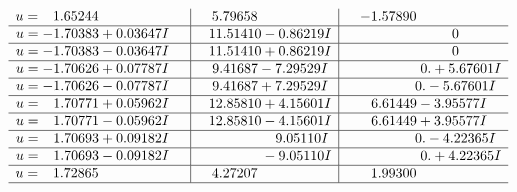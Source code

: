 \documentclass[1p]{elsarticle_modified}
\theoremstyle{definition}
\begin{document}
$$\begin{array}{c|c|c}
\begin{aligned}
u &= \phantom{-}1.65244\phantom{ +0.000000I}\end{aligned}
 & \phantom{-}5.79658\phantom{ +0.000000I} & -1.57890\phantom{ +0.000000I} \\ \hline\begin{aligned}
u &= -1.70383 + 0.03647 I\end{aligned}
 & \phantom{-}11.51410 - 0.86219 I & \phantom{-0.000000 } 0 \\ \hline\begin{aligned}
u &= -1.70383 - 0.03647 I\end{aligned}
 & \phantom{-}11.51410 + 0.86219 I & \phantom{-0.000000 } 0 \\ \hline\begin{aligned}
u &= -1.70626 + 0.07787 I\end{aligned}
 & \phantom{-}9.41687 - 7.29529 I & \phantom{-0.000000 -}0. + 5.67601 I \\ \hline\begin{aligned}
u &= -1.70626 - 0.07787 I\end{aligned}
 & \phantom{-}9.41687 + 7.29529 I & \phantom{-0.000000 } 0. - 5.67601 I \\ \hline\begin{aligned}
u &= \phantom{-}1.70771 + 0.05962 I\end{aligned}
 & \phantom{-}12.85810 + 4.15601 I & \phantom{-}6.61449 - 3.95577 I \\ \hline\begin{aligned}
u &= \phantom{-}1.70771 - 0.05962 I\end{aligned}
 & \phantom{-}12.85810 - 4.15601 I & \phantom{-}6.61449 + 3.95577 I \\ \hline\begin{aligned}
u &= \phantom{-}1.70693 + 0.09182 I\end{aligned}
 & \phantom{-0.000000 -}9.05110 I & \phantom{-0.000000 } 0. - 4.22365 I \\ \hline\begin{aligned}
u &= \phantom{-}1.70693 - 0.09182 I\end{aligned}
 & \phantom{-0.000000 } -9.05110 I & \phantom{-0.000000 -}0. + 4.22365 I \\ \hline\begin{aligned}
u &= \phantom{-}1.72865\phantom{ +0.000000I}\end{aligned}
 & \phantom{-}4.27207\phantom{ +0.000000I} & \phantom{-}1.99300\phantom{ +0.000000I}\\
 \hline 
 \end{array}$$\newpage
\end{document}
